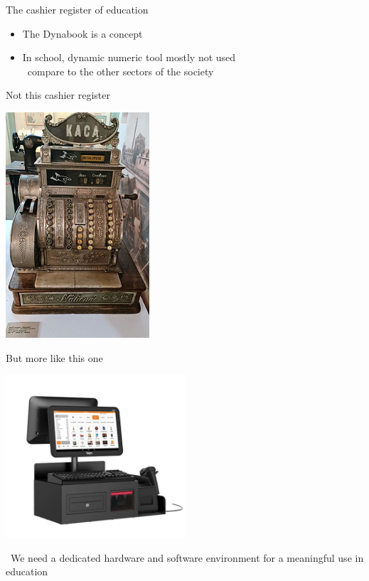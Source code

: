 \documentclass{beamer}
\newcommand{\tip}{\boldmath{\textcolor{red}{$\Rightarrow$}}}
\begin{document}
\begin{frame}{The cashier register of education}
  \begin{itemize}
  \item The Dynabook is a concept
  \item In school, dynamic numeric tool mostly not used\\
    \tip\ compare to the other sectors of the society
  \end{itemize}
\end{frame}
%
\begin{frame}{Not this cashier register}
  \begin{center}
      \includegraphics[width=0.4\textwidth]{Old_National_Cash_Register.jpg}
    \end{center}
\end{frame}
%
\begin{frame}{But more like this one}
  \begin{center}
    \includegraphics[width=0.5\textwidth]{Telpo-C68-02.png}
  \end{center}
  
  \tip\ We need a dedicated hardware and software environment for a
  meaningful use in education
\end{frame}
\end{document}
